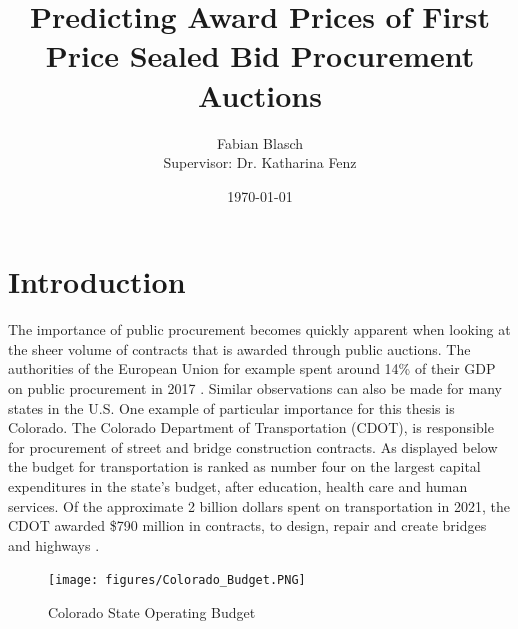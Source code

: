 \documentclass[a4paper,12pt, headsepline]{scrartcl}
\title{Predicting Award Prices of First Price Sealed Bid Procurement Auctions}
\date{\today}
\author{Fabian Blasch\\[0.4cm]{Supervisor: Dr. Katharina Fenz}}
\numberwithin{equation}{section}
\begin{document}
\begin{titlingpage}
\maketitle
\end{titlingpage}
\newpage
\tableofcontents
\thispagestyle{empty}
\clearpage
{} 

\section{Introduction}\label{sec:int}
The importance of public procurement becomes quickly apparent when looking at the sheer volume of contracts that is awarded through public auctions. The authorities of the European Union for example spent around 14\% of their GDP on public procurement in 2017 \citep{GarciaRodriguez2020}. Similar observations can also be made for many states in the U.S. One example of particular importance for this thesis is Colorado. The Colorado Department of Transportation (CDOT), is responsible for procurement of street and bridge construction contracts. As displayed below the budget for transportation is ranked as number four on the largest capital expenditures in the state's budget, after education, health care and human services. Of the approximate 2 billion dollars spent on transportation in 2021, the CDOT awarded \$790 million in contracts, to design, repair and create bridges and highways \citep{CDOTPRes}.

\begin{figure}[H]
	\texttt{[image: figures/Colorado\_Budget.PNG]}
	\caption{Colorado State Operating Budget \citep{ColoradoBudget}}\label{fig:bud}
\end{figure}
\end{document}
